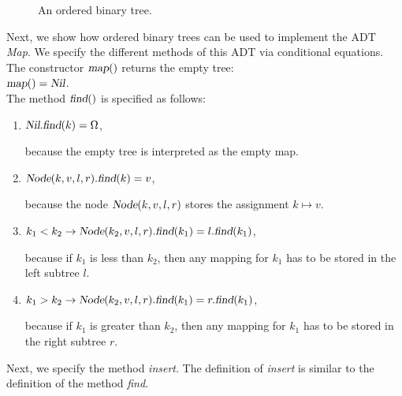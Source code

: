 \begin{figure}[!ht]
  \centering
  \caption{An ordered binary tree.}
  \label{fig:graph1}
\end{figure}


Next, we show how ordered binary trees can be used to implement the ADT  \textsl{Map}.  We specify
the different methods of this ADT via conditional equations.  The constructor $\textsl{map}()$
returns the empty tree:
\\[0.2cm]
\hspace*{1.3cm}
$\textsl{map}() = \textsl{Nil}$. 
\\[0.2cm]
The  method $\textsl{find}()$ is specified as follows:
\begin{enumerate}
\item $\textsl{Nil}.\textsl{find}(k) = \Omega$,

      because the empty tree is interpreted as the empty map.
\item $\textsl{Node}(k, v, l, r).\textsl{find}(k) = v$,

      because the node $\textsl{Node}(k,v,l,r)$ stores the assignment $k \mapsto v$.
\item $k_1 < k_2 \rightarrow \textsl{Node}(k_2, v, l, r).\textsl{find}(k_1) = l.\textsl{find}(k_1)$,

      because if $k_1$ is less than $k_2$, then any mapping for $k_1$ has to be stored in the left
      subtree  $l$.
\item $k_1 > k_2 \rightarrow \textsl{Node}(k_2, v, l, r).\textsl{find}(k_1) = r.\textsl{find}(k_1)$,

      because if $k_1$ is greater than $k_2$, then any mapping for $k_1$ has to be stored in the right
      subtree  $r$.
\end{enumerate}
Next, we specify the method  \textsl{insert}.  The definition of \textsl{insert} is similar to the
definition of the method  \textsl{find}.

